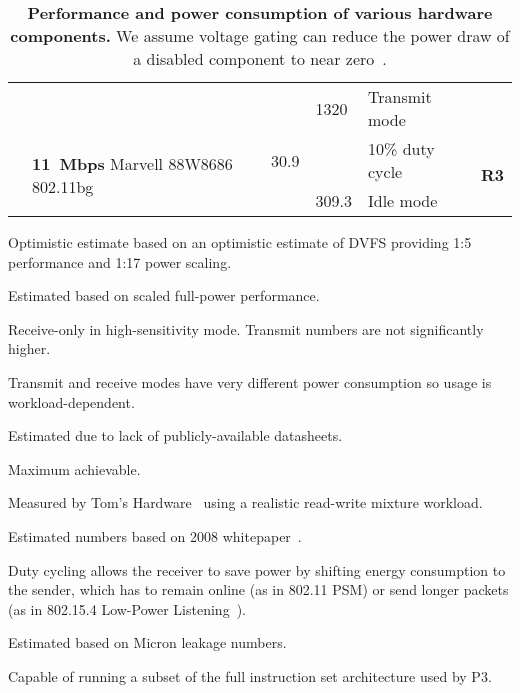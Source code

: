 \begin{table*}[t]
\begin{threeparttable}
{\begin{tabularx}{\textwidth}{clrlXr}
& & &
1320\tnote{8} &
Transmit mode
& \\ \cmidrule(l){2-6}

&
\multirow{2}{*}{\textbf{11~Mbps} Marvell 88W8686 802.11bg} &
30.9\tnote{2} & &
10\% duty cycle\tnote{9} &
\multirow{2}{*}{\textbf{R3}}
\\

& & &
309.3\tnote{4} &
Idle mode\tnote{4}
& \\ \toprule

\end{tabularx}
}
{\footnotesize
\begin{tablenotes}
\item [1] Optimistic estimate based on an optimistic estimate of DVFS providing 1:5 performance and
1:17 power scaling\cite{jssc02-PowerPC-SoC}.
\item [2] Estimated based on scaled full-power performance.
\item [3] Receive-only in high-sensitivity mode. Transmit numbers are not
significantly higher.
\item [4] Transmit and receive modes have very different power
consumption so usage is workload-dependent.
\item [5] Estimated due to lack of publicly-available datasheets.
\item [6] Maximum achievable.
\item [7] Measured by Tom's Hardware~\cite{ssd-tomshardware} using a realistic read-write mixture workload.
\item [8] Estimated numbers based on 2008
whitepaper~\cite{option3gpower-whitepaper}.
\item [9] Duty cycling allows the receiver to save power by shifting energy
consumption to the sender, which has to remain online (as in 802.11
PSM) or send longer packets (as in 802.15.4 Low-Power
Listening~\cite{tinyos-lpl}).
\item [10] Estimated based on Micron leakage numbers.
\item [11] Capable of running a subset of the full instruction set architecture
used by P3.
\end{tablenotes}
}
\caption{\textbf{Performance and power consumption of various hardware
components.} We assume voltage gating can reduce the power draw of a disabled
component to near zero~\cite{islped-vdd-gate}.}
\end{threeparttable}
\label{table-components}
\end{table*}
